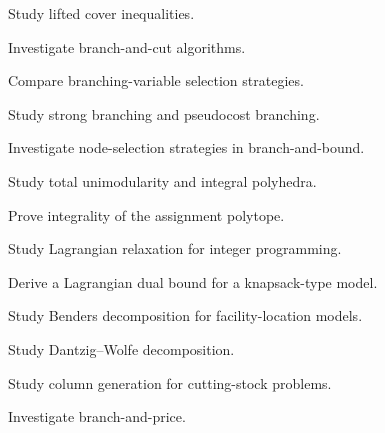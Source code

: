 \begin{exercise}[4]
Study lifted cover inequalities.
\end{exercise}

\begin{exercise}[4]
Investigate branch-and-cut algorithms.
\end{exercise}

\begin{exercise}[4]
Compare branching-variable selection strategies.
\end{exercise}

\begin{exercise}[4]
Study strong branching and pseudocost branching.
\end{exercise}

\begin{exercise}[4]
Investigate node-selection strategies in branch-and-bound.
\end{exercise}

\begin{exercise}[4]
Study total unimodularity and integral polyhedra.
\end{exercise}

\begin{exercise}[4]
Prove integrality of the assignment polytope.
\end{exercise}

\begin{exercise}[4]
Study Lagrangian relaxation for integer programming.
\end{exercise}

\begin{exercise}[4]
Derive a Lagrangian dual bound for a knapsack-type model.
\end{exercise}

\begin{exercise}[4]
Study Benders decomposition for facility-location models.
\end{exercise}

\begin{exercise}[4]
Study Dantzig--Wolfe decomposition.
\end{exercise}

\begin{exercise}[4]
Study column generation for cutting-stock problems.
\end{exercise}

\begin{exercise}[4]
Investigate branch-and-price.
\end{exercise}

